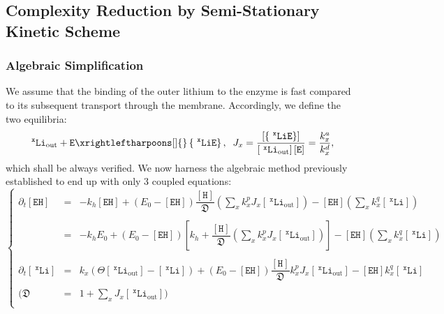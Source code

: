 \documentclass[aps,onecolumn,10pt]{revtex4}
\newcommand{\mychem}[1]{\mathtt{#1}}
\newcommand{\myconc}[1]{\left\lbrack{#1}\right\rbrack}
\newcommand{\spLi}[1]{{~^{\mychem{#1}}\mychem{Li}}}
\newcommand{\Li}[1]{\myconc{\spLi{#1}}}
\newcommand{\spEout}{\mychem{E}}
\newcommand{\Eout}{\myconc{\spEout}}
\newcommand{\spLiE}[1]{\left\lbrace\spLi{#1}\spEout\right\rbrace}
\newcommand{\LiE}[1]{\myconc{\spLiE{#1}}}
\newcommand{\spLiOut}[1]{{\spLi{#1}}_{\mathrm{out}}}
\newcommand{\LiOut}[1]{\myconc{\spLiOut{#1}}}
\newcommand{\spEHin}{\mychem{EH}}
\newcommand{\EHin}{\myconc{\spEHin}}
\newcommand{\spproton}{\mychem{H}}
\newcommand{\proton}{\myconc{\spproton}}
\newcommand{\todo}[1]{\framebox{\textbf{\color{WildStrawberry}{#1}}}}
\begin{document}
\subsection{Complexity Reduction by Semi-Stationary Kinetic Scheme}

\subsubsection{Algebraic Simplification}
We assume that the binding of the outer lithium to the enzyme is fast compared to its subsequent transport through the membrane. 
Accordingly, we define the two equilibria:
\begin{equation}
\label{eq:J}
\spLiOut{x} +  \spEout    \xrightleftharpoons[]{}  \spLiE{x}, \;\; J_x = \dfrac{\LiE{x}}{\LiOut{x} \Eout} = \dfrac{k_x^a}{k_x^d},
\end{equation}
which shall be always verified.
We now harness the algebraic method previously established\todo{ref} to end up with only 3 coupled equations:
\begin{equation}
\label{eq:sys}
\left\lbrace
	\begin{array}{rcl}
		\partial_t\EHin & = & -k_h \EHin + \left(E_0- \EHin\right) \dfrac{\proton}{\mathfrak{D}} \left(\sum_x k_x^p J_x\LiOut{x} \right)  
		- \EHin \left({\sum_x k_x^q \Li{x}} \right)
		\\
		\\
		& = & 
		-k_h E_0+ \left(E_0- \EHin\right)\left\lbrack k_h+ \dfrac{\proton}{\mathfrak{D}} \left(\sum_x k_x^p J_x\LiOut{x}\right)\right] 
		- \EHin \left( {\sum_x k_x^q \Li{x}} \right)
		\\
		\\
		\partial_t\Li{x} & = & k_x \left(\Theta\LiOut{x} -\Li{x} \right)  + \left(E_0-\EHin\right) \dfrac{\proton}{\mathfrak{D}}   k_x^p  J_x \LiOut{x}  
		- \EHin k_x^q \Li{x}
		\\
		\\
		(\mathfrak{D} & = & 1+\sum_x J_x \LiOut{x} )\\
	\end{array}
\right.
\end{equation}
\end{document}
